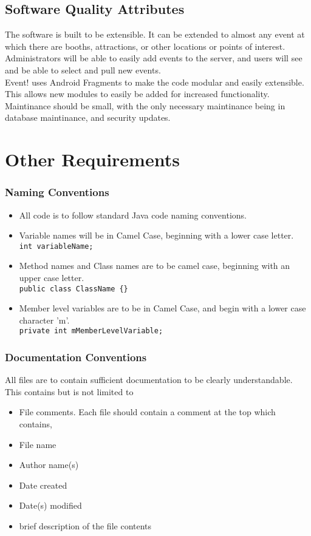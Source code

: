 \documentclass{scrreprt}
\begin{document}
\section{Software Quality Attributes}
The software is built to be extensible. It can be extended to almost any event at
which there are booths, attractions, or other locations or points of interest. \\ 
Administrators will be able to easily add events to the server, and users will see
and be able to select and pull new events. \\
Event! uses Android Fragments to make the code modular and easily extensible. 
This allows new modules to easily be added for increased functionality. \\
Maintinance should be small, with the only necessary maintinance being in 
database maintinance, and security updates. \\

\chapter{Other Requirements}


\subsection{Naming Conventions}
\begin{itemize}
\item All code is to follow standard Java code naming conventions.
\item Variable names will be in Camel Case, beginning with a lower case letter.\\
\texttt{int variableName;}
\item Method names and Class names are to be camel case, beginning with an upper case letter. \\
\texttt{public class ClassName \{\}}
\item Member level variables are to be in Camel Case, and begin with a lower case character 'm'. \\
\texttt{private int mMemberLevelVariable;}
\end{itemize}

\subsection{Documentation Conventions}
All files are to contain sufficient documentation to be clearly understandable. This 
contains but is not limited to
\begin{itemize}
\item File comments. Each file should contain a comment at the top which contains,
\item File name
\item Author name(s)
\item Date created
\item Date(s) modified
\item brief description of the file contents
\end{itemize}
\end{document}
